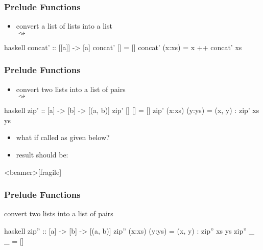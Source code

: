 \documentclass[dvipsnames]{beamer}
\theoremstyle{plain}
\begin{document}
\begin{frame}[fragile]
  \frametitle{Prelude Functions}

  \begin{itemize}
    \item convert a list of lists into a list\\
      \pygment{haskell}{concat [[2, 3], [], [4]} $\rightsquigarrow$
  \end{itemize}

  \begin{exampleblock}{}
    \begin{pygments}{haskell}
concat' :: [[a]] -> [a]
concat' []     = []
concat' (x:xs) = x ++ concat' xs
    \end{pygments}
  \end{exampleblock}
\end{frame}

\begin{frame}[fragile]
  \frametitle{Prelude Functions}

  \begin{itemize}
    \item convert two lists into a list of pairs\\
       $\rightsquigarrow$
  \end{itemize}

  \begin{exampleblock}{}
    \begin{pygments}{haskell}
zip' :: [a] -> [b] -> [(a, b)]
zip' []     []     = []
zip' (x:xs) (y:ys) = (x, y) : zip' xs ys
    \end{pygments}
  \end{exampleblock}

  \pause
  \begin{itemize}
    \item what if called as given below?\\
    \item result should be: 
  \end{itemize}
\end{frame}

\begin{frame}<beamer>[fragile]
  \frametitle{Prelude Functions}

  \begin{exampleblock}{convert two lists into a list of pairs}
    \begin{pygments}{haskell}
zip'' :: [a] -> [b] -> [(a, b)]
zip'' (x:xs) (y:ys) = (x, y) : zip'' xs ys
zip'' _      _      = []
    \end{pygments}
  \end{exampleblock}
\end{frame}
\end{document}
